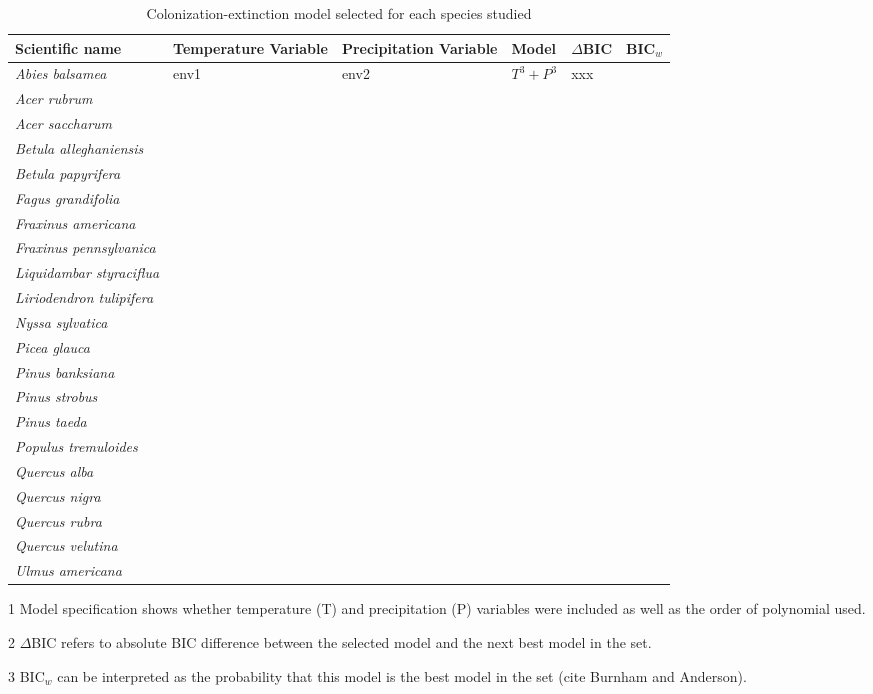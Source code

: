 \begin{table}[tb]
\begin{threeparttable}
\label{tab:model_selection}
\caption{Colonization-extinction model selected for each species studied}
\begin{tabular}{llllll}
\toprule
Scientific name               & Temperature Variable & Precipitation Variable & Model\tnote{1} & $\Delta$BIC\tnote{2} & BIC$_w$\tnote{3} \\ 
\midrule
{\it Abies balsamea}          & env1                 & env2                   & $T^3 + P^3$    & xxx                  &                  \\
{\it Acer rubrum}             &   &   & & \\
{\it Acer saccharum}          &   &   & & \\
{\it Betula alleghaniensis}   &   &   & & \\
{\it Betula papyrifera}       &   &   & & \\
{\it Fagus grandifolia}       &   &   & & \\
{\it Fraxinus americana}      &   &   & & \\
{\it Fraxinus pennsylvanica}  &   &   & & \\
{\it Liquidambar styraciflua} &   &   & & \\
{\it Liriodendron tulipifera} &   &   & & \\
{\it Nyssa sylvatica}         &   &   & & \\
{\it Picea glauca}            &   &   & & \\
{\it Pinus banksiana}         &   &   & & \\
{\it Pinus strobus}           &   &   & & \\
{\it Pinus taeda}             &   &   & & \\
{\it Populus tremuloides}     &   &   & & \\ 
{\it Quercus alba}            &   &   & & \\
{\it Quercus nigra}           &   &   & & \\
{\it Quercus rubra}           &   &   & & \\
{\it Quercus velutina}        &   &   & & \\
{\it Ulmus americana}         &   &   & & \\ 
\bottomrule
\end{tabular}
\begin{tablenotes}
\item [1] Model specification shows whether temperature (T) and precipitation (P) variables were included as well as the order of polynomial used.
\item [2] $\Delta$BIC refers to absolute BIC difference between the selected model and the next best model in the set.
\item [3] BIC$_w$ can be interpreted as the probability that this model is the best model in the set (cite Burnham and Anderson).
\end{tablenotes}
\end{threeparttable}
\end{table}



